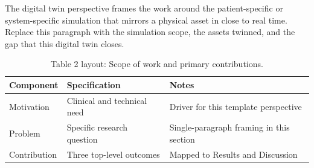 
The digital twin perspective frames the work around the patient-specific or system-specific simulation that mirrors a physical asset in close to real time. Replace this paragraph with the simulation scope, the assets twinned, and the gap that this digital twin closes.

\begin{table}[H]
\caption{Table 2 layout: Scope of work and primary contributions.}
\label{tab:intro_overview}
\centering
\begin{tabular}{>{\raggedright\arraybackslash}p{3.4cm} >{\raggedright\arraybackslash}p{4.6cm} >{\raggedright\arraybackslash}p{5.4cm}}
\toprule
\textbf{Component} & \textbf{Specification} & \textbf{Notes} \\
\midrule
  Motivation & Clinical and technical need & Driver for this template perspective \\
  Problem & Specific research question & Single-paragraph framing in this section \\
  Contribution & Three top-level outcomes & Mapped to Results and Discussion \\
\bottomrule
\end{tabular}
\end{table}
